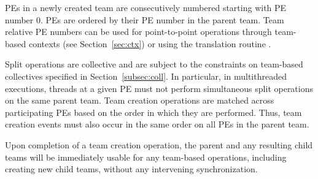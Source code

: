 \acp{PE} in a newly created team are consecutively numbered starting with
\ac{PE} number 0. \acp{PE} are ordered by their \ac{PE} number in
the parent team. Team relative \ac{PE}
numbers can be used for point-to-point operations through team-based
contexts (see Section~\ref{sec:ctx}) or using the translation routine
.

Split operations are collective and are subject to the constraints on
team-based collectives specified in Section~\ref{subsec:coll}. In particular,
in multithreaded executions, threads at a given \ac{PE} must not perform
simultaneous split operations on the same parent team.
Team creation operations are matched across participating PEs based
on the order in which they are performed. Thus, team creation events must also
occur in the same order on all \acp{PE} in the parent team.

Upon completion of a team creation operation, the parent and any resulting child teams
will be immediately usable for any team-based operations, including creating new child
teams, without any intervening synchronization.
